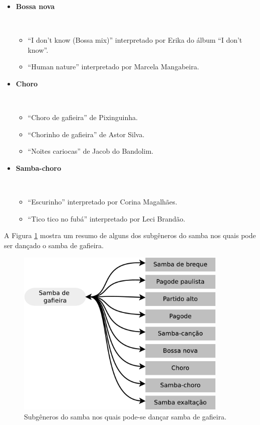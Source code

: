 \begin{itemize}
\item \textbf{Bossa nova}
\begin{example} ~
\begin{itemize}
\item ``I don't know (Bossa mix)'' interpretado por Erika do álbum ``I don't know''.
\item ``Human nature'' interpretado por Marcela Mangabeira.
\end{itemize}
\end{example} 


\item \textbf{Choro}
\begin{example} ~
\begin{itemize}
\item ``Choro de gafieira'' de Pixinguinha.
\item ``Chorinho de gafieira'' de Astor Silva.
\item ``Noites cariocas'' de Jacob do Bandolim.
\end{itemize}
\end{example} 


\item \textbf{Samba-choro}
\begin{example} ~
\begin{itemize}
\item ``Escurinho'' interpretado por Corina Magalhães.
\item ``Tico tico no fubá'' interpretado por Leci Brandão.
\end{itemize}
\end{example}

\end{itemize}

A Figura \ref{fig:gafieiradancaestilos} mostra um resumo de alguns dos 
subgêneros do samba nos quais pode ser dançado o samba de gafieira.
\begin{figure}[h]
  \centering
    \includegraphics[width=0.9\textwidth]{chapters/cap-historia-sambagafieira/gafieiravcmusica.eps}
  \caption{ Subgêneros do samba nos quais pode-se dançar samba de gafieira.}
\label{fig:gafieiradancaestilos}
\end{figure}

